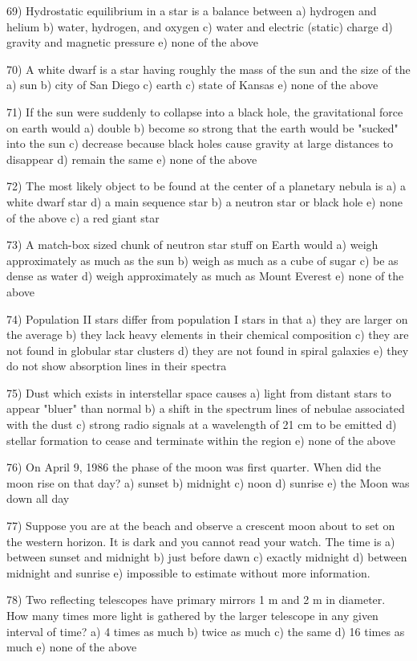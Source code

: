 69) Hydrostatic equilibrium in a star is a balance between
a) hydrogen and helium
b) water, hydrogen, and oxygen
c) water and electric (static) charge
d) gravity and magnetic pressure
e) none of the above

70) A white dwarf is a star having roughly the mass of the sun
and the size of the
a) sun b) city of San Diego c) earth c) state of Kansas
e) none of the above

71) If the sun were suddenly to collapse into a black hole,
the gravitational force on earth would
a) double
b) become so strong that the earth would be "sucked" into the sun
c) decrease because black holes cause gravity at large distances
to disappear
d) remain the same
e) none of the above

72) The most likely object to be found at the center of a planetary nebula is
a) a white dwarf star d) a main sequence star
b) a neutron star or black hole e) none of the above
c) a red giant star

73) A match-box sized chunk of neutron star stuff on Earth would
a) weigh approximately as much as the sun
b) weigh as much as a cube of sugar
c) be as dense as water
d) weigh approximately as much as Mount Everest
e) none of the above

74) Population II stars differ from population I stars in that
a) they are larger on the average
b) they lack heavy elements in their chemical composition
c) they are not found in globular star clusters
d) they are not found in spiral galaxies
e) they do not show absorption lines in their spectra

75) Dust which exists in interstellar space causes
a) light from distant stars to appear "bluer" than normal
b) a shift in the spectrum lines of nebulae associated with the dust
c) strong radio signals at a wavelength of 21 cm to be emitted
d) stellar formation to cease and terminate within the region
e) none of the above

76) On April 9, 1986 the phase of the moon was first quarter.
When did the moon rise on that day?
a) sunset b) midnight c) noon d) sunrise
e) the Moon was down all day

77) Suppose you are at the beach and observe a crescent moon about to set
on the western horizon. It is dark and you cannot read your watch.
The time is
a) between sunset and midnight b) just before dawn
c) exactly midnight d) between midnight and sunrise
e) impossible to estimate without more information.

78) Two reflecting telescopes have primary mirrors 1 m and 2 m in diameter.
How many times more light is gathered by the larger telescope in any
given interval of time?
a) 4 times as much b) twice as much c) the same d) 16 times as much
e) none of the above

